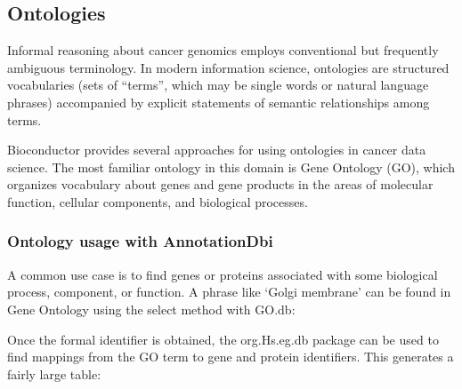 \subsection{Ontologies}\label{ontologies}

Informal reasoning about cancer genomics employs conventional
but frequently ambiguous terminology. In modern
information science, ontologies are structured vocabularies
(sets of ``terms'', which may be single words or natural language
phrases) accompanied by
explicit statements of semantic relationships among terms.

Bioconductor provides several approaches for using ontologies
in cancer data science. The most familiar ontology
in this domain is Gene Ontology (GO), which organizes vocabulary
about genes and gene products in
the areas of molecular function, cellular components, and
biological processes.

\subsubsection{Ontology usage with AnnotationDbi}\label{ontology-usage-with-annotationdbi}

A common use case is to find genes or proteins associated
with some biological process, component, or function.
A phrase like `Golgi membrane' can be found in Gene Ontology
using the select method with GO.db:

\begin{shaded}
\begin{Highlighting}[]
\NormalTok{,}
   \NormalTok{, }\NormalTok{(}\NormalTok{, }\NormalTok{, }\NormalTok{))}
\end{Highlighting}
\end{shaded}

Once the formal identifier is obtained, the org.Hs.eg.db package
can be used to find mappings from the GO term to gene and protein
identifiers. This generates a fairly large table:

